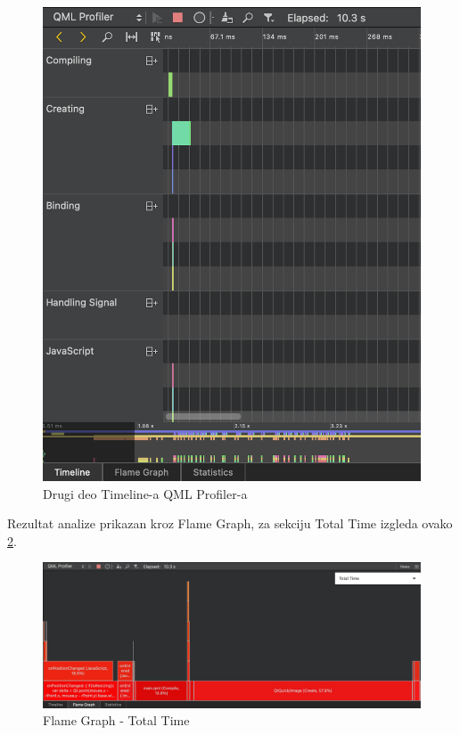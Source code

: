 \documentclass[a4paper]{article}
\begin{document}
\begin{figure}[h!]
\begin{center}
\includegraphics[scale=0.40]{qml-prof-04.png}
\end{center}
\caption{Drugi deo Timeline-a QML Profiler-a}
\label{fig: qml-04}
\end{figure}

\newpage
Rezultat analize prikazan kroz Flame Graph, za sekciju Total Time izgleda ovako \ref{fig: qml-05}.

\begin{figure}[h!]
\begin{center}
\includegraphics[scale=0.30]{qml-prof-05.png}
\end{center}
\caption{Flame Graph - Total Time}
\label{fig: qml-05}
\end{figure}
\end{document}

